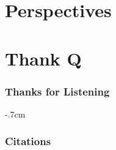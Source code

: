 


\section{Perspectives}
\begin{frame}
  \centering
  \hspace{-1cm}
  \huge
\end{frame}

\section*{Thank Q}
\begin{frame}
  \frametitle{Thanks for Listening}
  \hspace*{-3cm}
  \leftskip-.7cm
  
  
\end{frame}

\begin{frame}[shrink=50]
  \frametitle{Citations}
  \printbibliography
  

\end{frame}